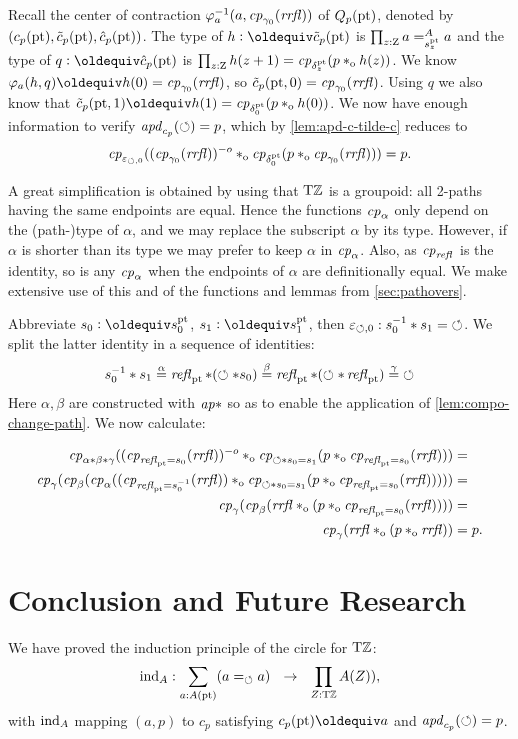 \documentclass[a4,12pt]{amsart}
\begin{document}
Recall the center of contraction $\varphi_{a}^{-1}(a,\mathit{cp}_{\gamma_0}(\mathit{rrfl}))$
of $Q_p({\mathord{\mathrm{pt}}})$, denoted by $(c_p({\mathord{\mathrm{pt}}}),\tilde{c}_p({\mathord{\mathrm{pt}}}),\hat{c}_p({\mathord{\mathrm{pt}}}))$.
The type of $h\defeq\tilde{c}_p(\pt)$ is $\prod_{z:\mathrm{Z}} a =^A_{s^{\mathord{\mathrm{pt}}}_z} a$ and
the type of $q\defeq\hat{c}_p(\pt)$ is $\prod_{z:\mathrm{Z}} h(z+1) = \mathit{cp}_{\delta^{\mathord{\mathrm{pt}}}_z}(p *_{\mathrm{o}} h(z))$.
We know $\varphi_{a}(h,q) \jdeq h(0) = \cp{\gamma_0}(\rrfl)$, 
so $\tilde c_p({\mathord{\mathrm{pt}}},0) = \mathit{cp}_{\gamma_0}(\mathit{rrfl})$.
Using $q$ we also know that 
$\tilde c_p(\pt,1) \jdeq h(1) = \cp{\delta^\pt_0}(p \cto h(0))$.
We now have enough information to verify $\mathop{{\it apd}_{c_p}}(\circlearrowleft)=p$,
which by \cref{lem:apd-c-tilde-c} reduces to 
\[
\mathit{cp}_{\varepsilon_{\circlearrowleft,0}}
((\mathit{cp}_{\gamma_0}(\mathit{rrfl}))^{-o}*_{\mathrm{o}} 
\mathit{cp}_{\delta^{\mathord{\mathrm{pt}}}_0}(p *_{\mathrm{o}} \mathit{cp}_{\gamma_0}(\mathit{rrfl}))) = p.
\]

A great simplification is obtained by using that ${\mathrm{T}\mathbb{Z}}$ is a groupoid:
all 2-paths having the same endpoints are equal.
Hence the functions $\mathit{cp}_{\alpha}$ only depend on the (path-)type
of $\alpha$, and we may replace the subscript $\alpha$ by its type.
However, if $\alpha$ is shorter than its type we may 
prefer to keep $\alpha$ in $\mathit{cp}_{\alpha}$.
Also, as $\mathit{cp}_{\mathop{{\it refl}_{}}}$ is the identity, so is any $\mathit{cp}_{\alpha}$
when the endpoints of $\alpha$ are definitionally equal. 
We make extensive use of this and of the functions and
lemmas from \cref{sec:pathovers}.

Abbreviate $s_0 \defeq s^\pt_0$, $s_1 \defeq s^\pt_1$, 
then $\varepsilon_{\circlearrowleft,0} : s_0^{-1} * s_1 = {\circlearrowleft}$.
We split the latter identity in a sequence of identities:
\[
s_0^{-1} * s_1 \stackrel{\alpha}{=} 
\mathop{{\it refl}_{{\mathord{\mathrm{pt}}}}}*(\circlearrowleft* s_0) \stackrel{\beta}{=} 
\mathop{{\it refl}_{{\mathord{\mathrm{pt}}}}}*(\circlearrowleft*\mathop{{\it refl}_{{\mathord{\mathrm{pt}}}}})\stackrel{\gamma}{=} {\circlearrowleft}
\]
Here $\alpha,\beta$ are constructed with $\mathop{{\it ap}{*}}$ so as to
enable the application of \cref{lem:compo-change-path}.
We now calculate:

\begin{align*}
\mathit{cp}_{\alpha*\beta*\gamma}
((\mathit{cp}_{\mathop{{\it refl}_{{\mathord{\mathrm{pt}}}}} = s_0}(\mathit{rrfl}))^{-o} *_{\mathrm{o}}
   \mathit{cp}_{\circlearrowleft* s_0 = s_1}(p*_{\mathrm{o}}\mathit{cp}_{\mathop{{\it refl}_{{\mathord{\mathrm{pt}}}}} = s_0}(\mathit{rrfl})))&= \\
\mathit{cp}_{\gamma}(\mathit{cp}_{\beta}(\mathit{cp}_{\alpha}
((\mathit{cp}_{\mathop{{\it refl}_{{\mathord{\mathrm{pt}}}}} = s_0^{-1}}(\mathit{rrfl})) *_{\mathrm{o}}
   \mathit{cp}_{\circlearrowleft* s_0 = s_1}(p*_{\mathrm{o}}\mathit{cp}_{\mathop{{\it refl}_{{\mathord{\mathrm{pt}}}}} = s_0}(\mathit{rrfl})))))&= \\
\mathit{cp}_{\gamma}(\mathit{cp}_{\beta}
(\mathit{rrfl} *_{\mathrm{o}}
   (p*_{\mathrm{o}}\mathit{cp}_{\mathop{{\it refl}_{{\mathord{\mathrm{pt}}}}} = s_0}(\mathit{rrfl}))))&= \\
\mathit{cp}_{\gamma}(\mathit{rrfl}*_{\mathrm{o}}(p*_{\mathrm{o}}\mathit{rrfl}))&= p. 
\end{align*}

\section{Conclusion and Future Research}
We have proved the induction principle of the circle for ${\mathrm{T}\mathbb{Z}}$:
\[
{\mathop{\mathrm{ind}}}_A : \sum_{a:A({\mathord{\mathrm{pt}}})}(a=_\circlearrowleft a) ~~\to~~ \prod_{Z:{\mathrm{T}\mathbb{Z}}} A(Z)),
\]
with ${\mathop{\mathrm{ind}}}_A$ mapping $(a,p)$ to $c_p$ satisfying $c_p(\pt) \jdeq a$ 
and $\mathop{{\it apd}_{c_p}}(\circlearrowleft) = p$.
\end{document}
